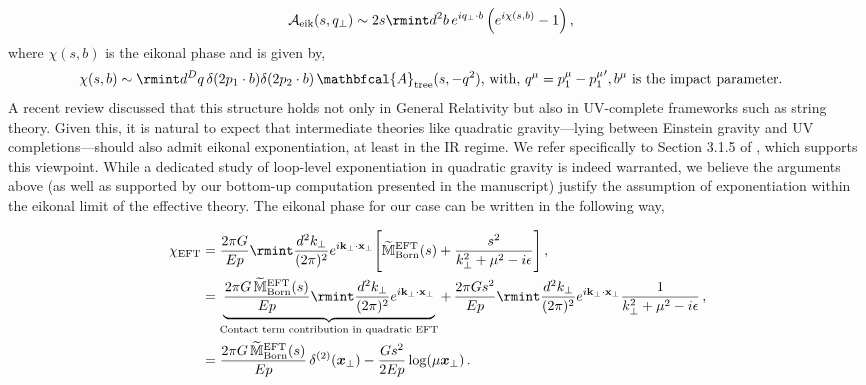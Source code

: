 {\begin{align}
&\mathcal{A}_{\text{eik}}(s, q_\perp) \sim 2s \rmint d^2b\, e^{iq_\perp \cdot b} \left( e^{i\chi(s,b)} - 1 \right),
\end{align}
where \( \chi(s, b) \) is the eikonal phase and is given by,
\begin{align}
 &   \chi(s,b)\sim \rmint d^D q\, \delta(2 p_1\cdot b) \delta(2 p_2\cdot b)\,\mathbfcal{A}_{\textrm{tree}}(s,-q^2), \,\textrm{with},\,q^\mu=p_1^\mu-{p_1^\mu}', b^\mu\textrm{ is the impact parameter.}
\end{align}
A recent review \cite{DiVecchia:2023frv} discussed that this structure holds not only in General Relativity but also in UV-complete frameworks such as string theory. Given this, it is natural to expect that intermediate theories like quadratic gravity—lying between Einstein gravity and UV completions—should also admit eikonal exponentiation, at least in the IR regime. We refer specifically to Section 3.1.5 of \cite{DiVecchia:2023frv}, which supports this viewpoint.
While a dedicated study of loop-level exponentiation in quadratic gravity is indeed warranted, we believe the arguments above (as well as supported by our bottom-up computation presented in the manuscript) justify the assumption of exponentiation within the eikonal limit of the effective theory.
}The eikonal phase for our case can be written in the following way,

\begin{align}
\begin{split}
\hspace{0cm}\chi_{\textrm{EFT}}&=\frac{2\pi G}{Ep}\rmint\frac{ d^2k_{\perp}}{(2\pi)^2}e^{i{\bf k_\perp }\cdot {\bf x_\perp}}\Bigg[\widetilde{\mathbb{M}}^{\textrm{EFT}}_{\textrm{Born}}(s)+\frac{s^2}{k_\perp^2+\mu^2-i\epsilon}\Bigg]\,,\\&
    =\underbrace{\frac{2\pi G\,\widetilde{\mathbb{M}}^{\textrm{EFT}}_{\textrm{Born}}(s)}{Ep}\rmint\frac{ d^2k_{\perp}}{(2\pi)^2}e^{i{\bf k_\perp }\cdot {\bf x_\perp}}}_{\text{Contact term contribution in quadratic EFT}}+\,\frac{2\pi G s^2}{Ep}\rmint\frac{ d^2k_{\perp}}{(2\pi)^2}e^{i{\bf k_\perp }\cdot {\bf x_\perp}}\frac{1}{k_\perp^2+\mu^2-i\epsilon}\,,\\&
    =\frac{2\pi G\, \widetilde{\mathbb{M}}^{\textrm{EFT}}_{\textrm{Born}}(s)}{E p}\,\delta^{(2)}(\boldsymbol{x}_\perp)-\frac{G s^2}{2 Ep}\log(\mu \boldsymbol{x}_{\perp})\,.\label{3.19p}
      \end{split}
\end{align}

